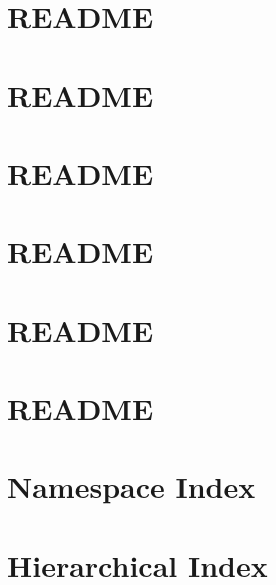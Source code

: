 \documentclass[twoside]{book}
\newcommand{\+}{\discretionary{\mbox{\scriptsize$\hookleftarrow$}}{}{}}
\begin{document}
\chapter{R\+E\+A\+D\+ME}
\label{md_smacc_sm_reference_library_sm_pr2_plugs_README}

\chapter{R\+E\+A\+D\+ME}
\label{md_smacc_sm_reference_library_sm_respira_1_README}

\chapter{R\+E\+A\+D\+ME}
\label{md_smacc_sm_reference_library_sm_starcraft_ai_README}

\chapter{R\+E\+A\+D\+ME}
\label{md_smacc_sm_reference_library_sm_three_some_README}

\chapter{R\+E\+A\+D\+ME}
\label{md_smacc_sm_reference_library_sm_update_loop_README}

\chapter{R\+E\+A\+D\+ME}
\label{md_smacc_sm_reference_library_sm_viewer_sim_README}

\chapter{Namespace Index}

\chapter{Hierarchical Index}

\end{document}

